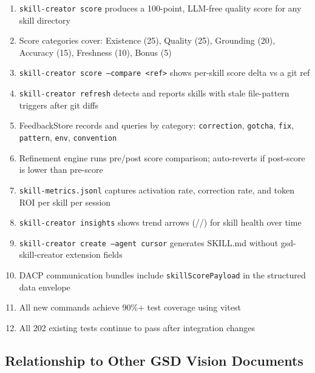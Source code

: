 \documentclass[11pt,letterpaper]{article}
\begin{document}
\begin{enumerate}
  \item \texttt{skill-creator score} produces a 100-point, LLM-free quality score for any skill directory
  \item Score categories cover: Existence (25), Quality (25), Grounding (20), Accuracy (15), Freshness (10), Bonus (5)
  \item \texttt{skill-creator score --compare <ref>} shows per-skill score delta vs a git ref
  \item \texttt{skill-creator refresh} detects and reports skills with stale file-pattern triggers after git diffs
  \item FeedbackStore records and queries by category: \texttt{correction}, \texttt{gotcha}, \texttt{fix}, \texttt{pattern}, \texttt{env}, \texttt{convention}
  \item Refinement engine runs pre/post score comparison; auto-reverts if post-score is lower than pre-score
  \item \texttt{skill-metrics.jsonl} captures activation rate, correction rate, and token ROI per skill per session
  \item \texttt{skill-creator insights} shows trend arrows (\textuparrow/\textdownarrow/\textrightarrow) for skill health over time
  \item \texttt{skill-creator create --agent cursor} generates SKILL.md without gsd-skill-creator extension fields
  \item DACP communication bundles include \texttt{skillScorePayload} in the structured data envelope
  \item All new commands achieve 90\%+ test coverage using vitest
  \item All 202 existing tests continue to pass after integration changes
\end{enumerate}

\subsection{Relationship to Other GSD Vision Documents}
\end{document}
